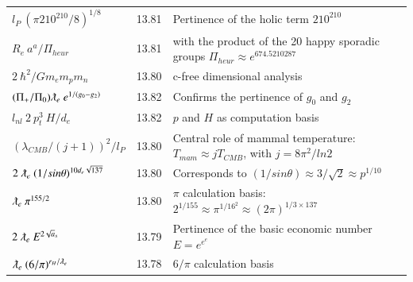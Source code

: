 \documentclass[a4paper,9pt]{article}
\begin{document}
\begin{table}
\begin{tabular}{lll}
  
  
  
  
 
  
  
  $ l_{P} ~(\pi 210^{210}/8)^{1/8}$  & 13.81    & Pertinence of the holic term $210^{210}$  \\
  
  
  
  
  
  
  
 
 $R_e~ a^a/\Pi_{heur}$  & 13.81    & with the product of the 20 happy sporadic groups $\Pi_{heur}\approx e^{674.5210287}$  \\
 


$ 2~\hbar^2/Gm_em_pm_n $ & 13.80 & c-free dimensional analysis \cite{Sanchez4}  \\
 
 $(\Pi_+/\Pi_0) \lambdabar_{e}~ e^{1/(g_0-g_2)}$ & 13.82 & Confirms the pertinence of $g_0$ and $g_2$  \\
 
 $l_{nl}~2~p_t^3~H/d_e $ & 13.82 & $p$ and $H$ as computation basis  \\

 $ (\lambda_{CMB}/(j+1))^2/l_P$ & 13.80 & Central role of mammal temperature: $T_{mam}\approx j T_{CMB}$, with $j = 8\pi^2/ln2$ \\
 
  $ 2~ \lambdabar_{e}~ (1/sin\theta)^{10d_e\sqrt {137}} $ & 13.80 & Corresponds to $(1/sin\theta) \approx 3/\sqrt2 \approx p^{1/10}$   \\
  
  $ \lambdabar_{e} ~\pi^{155/2}$ & 13.80 & $\pi$ calculation basis: $2^{1/155} \approx \pi^{1/16^2}  \approx (2\pi)^{1/3\times 137} $  \\
  
  $ 2~\lambdabar_{e}~ E^{2\sqrt a_s}$ & 13.79 & Pertinence of the basic economic number $E = e^{e^e}$  \\
  
  
  $ \lambdabar_{e} ~(6/\pi)^{r_H/\lambdabar_e}$ & 13.78 & $6/\pi$ calculation basis   \\  
  
  
  

\end{tabular}
\end{table}
\end{document}
